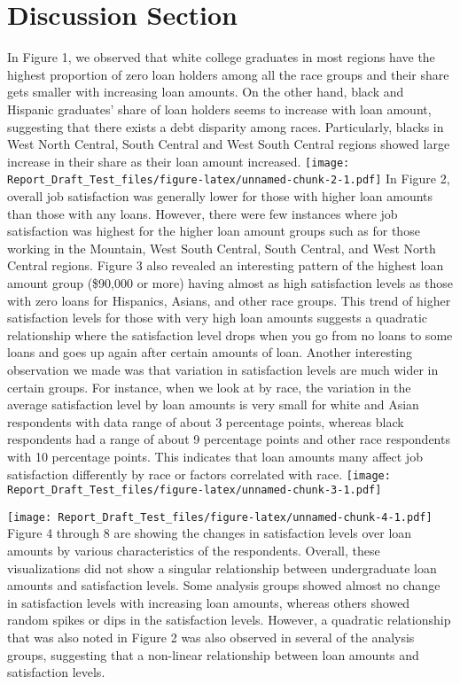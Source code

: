 \documentclass[]{article}
\begin{document}
\section{Discussion Section}\label{discussion-section}

In Figure 1, we observed that white college graduates in most regions
have the highest proportion of zero loan holders among all the race
groups and their share gets smaller with increasing loan amounts. On the
other hand, black and Hispanic graduates' share of loan holders seems to
increase with loan amount, suggesting that there exists a debt disparity
among races. Particularly, blacks in West North Central, South Central
and West South Central regions showed large increase in their share as
their loan amount increased.
\texttt{[image: Report\_Draft\_Test\_files/figure-latex/unnamed-chunk-2-1.pdf]}
In Figure 2, overall job satisfaction was generally lower for those with
higher loan amounts than those with any loans. However, there were few
instances where job satisfaction was highest for the higher loan amount
groups such as for those working in the Mountain, West South Central,
South Central, and West North Central regions. Figure 3 also revealed an
interesting pattern of the highest loan amount group (\$90,000 or more)
having almost as high satisfaction levels as those with zero loans for
Hispanics, Asians, and other race groups. This trend of higher
satisfaction levels for those with very high loan amounts suggests a
quadratic relationship where the satisfaction level drops when you go
from no loans to some loans and goes up again after certain amounts of
loan. Another interesting observation we made was that variation in
satisfaction levels are much wider in certain groups. For instance, when
we look at by race, the variation in the average satisfaction level by
loan amounts is very small for white and Asian respondents with data
range of about 3 percentage points, whereas black respondents had a
range of about 9 percentage points and other race respondents with 10
percentage points. This indicates that loan amounts many affect job
satisfaction differently by race or factors correlated with race.
\texttt{[image: Report\_Draft\_Test\_files/figure-latex/unnamed-chunk-3-1.pdf]}

\texttt{[image: Report\_Draft\_Test\_files/figure-latex/unnamed-chunk-4-1.pdf]}
Figure 4 through 8 are showing the changes in satisfaction levels over
loan amounts by various characteristics of the respondents. Overall,
these visualizations did not show a singular relationship between
undergraduate loan amounts and satisfaction levels. Some analysis groups
showed almost no change in satisfaction levels with increasing loan
amounts, whereas others showed random spikes or dips in the satisfaction
levels. However, a quadratic relationship that was also noted in Figure
2 was also observed in several of the analysis groups, suggesting that a
non-linear relationship between loan amounts and satisfaction levels.
\end{document}
